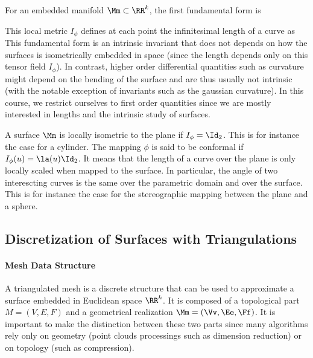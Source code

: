\begin{defn}
For an embedded manifold $\Mm \subset \RR^k$, the first fundamental form is
\end{defn}

This local metric $I_\phi$ defines at each point the infinitesimal length of a curve as 
This fundamental form is an intrinsic invariant that does not depends on how the surfaces is isometrically embedded in space (since the length depends only on this tensor field $I_\phi$). In contrast, higher order differential quantities such as curvature might depend on the bending of the surface and are thus usually not intrinsic (with the notable exception of invariants such as the gaussian curvature). In this course, we restrict ourselves to first order quantities since we are mostly interested in lengths and the intrinsic study of surfaces.  


\begin{exmp}
A surface $\Mm$ is locally isometric to the plane if $I_\phi = \Id_2$. This is for instance the case for a cylinder. The mapping $\phi$ is said to be conformal if $I_\phi(u) = \la(u)\Id_2$. It means that the length of a curve over the plane is only locally scaled when mapped to the surface. In particular, the angle of two interescting curves is the same over the parametric domain and over the surface. This is for instance the case for the stereographic mapping between the plane and a sphere.
\end{exmp}

\subsection{Discretization of Surfaces with Triangulations}
\label{subsec-mesh-structure}

\paragraph{Mesh Data Structure}

A triangulated mesh is a discrete structure that can be used to approximate a surface embedded in Euclidean space $\RR^k$. It is composed of a topological part $M=(V,E,F)$ and a geometrical realization $\Mm=(\Vv,\Ee,\Ff)$. It is important to make the distinction between these two parts since many algorithms rely only on geometry (point clouds processings such as dimension reduction) or on topology (such as compression).

